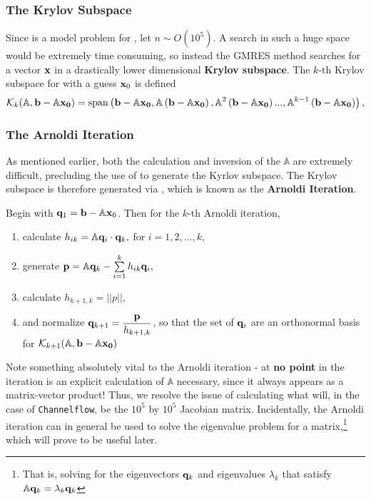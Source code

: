 \subsubsection{The Krylov Subspace}
Since  is a model problem for , let $n \sim O(10^5)$. A search in such a huge space would be extremely time consuming, so instead the GMRES method searches for a vector $\mathbf{x}$ in a drastically lower dimensional {\bf Krylov subspace}. The $k$-th Krylov subspace for  with a guess $\mathbf{x}_0$ is defined
\begin{equation}\label{eq:krylov}
\mathcal{K}_k(\mathbb{A},\mathbf{b}-\mathbb{A}\mathbf{x_0}) = \mathrm{span}\left ( \mathbf{b}-\mathbb{A}\mathbf{x_0},\mathbb{A}\left ( \mathbf{b}-\mathbb{A}\mathbf{x_0} \right ),\mathbb{A}^2\left ( \mathbf{b}-\mathbb{A}\mathbf{x_0} \right )...,\mathbb{A}^{k-1}\left ( \mathbf{b}-\mathbb{A}\mathbf{x_0} \right ) \right ),
 \end{equation}

 \subsubsection{The Arnoldi Iteration}
 
As mentioned earlier, both the calculation and inversion of the $\mathbb{A}$ are extremely difficult, precluding the use of  to generate the Kyrlov subspace. The Krylov subspace is therefore generated via , which is known as the {\bf Arnoldi Iteration}. 
\begin{algorithm}\label{alg:Arnoldi}
Begin with $\mathbf{q}_1 = \mathbf{b} - \mathbb{A}\mathbf{x}_0$. Then for the $k$-th Arnoldi iteration,
\begin{enumerate}
\item calculate $h_{ik} = \mathbb{A}\mathbf{q}_{i} \cdot \mathbf{q}_k,$ for $i = 1,2,...,k$,
\item generate $\Vector{p} = \mathbb{A}\Vector{q}_k - \sum{i=1}{k}{h_{ik}\Vector{q}_i},$ 
\item calculate $h_{k+1,k} = ||p||$,
\item and normalize $\mathbf{q}_{k+1} = \dfrac{\mathbf{p}}{h_{k+1,k}}$, so that the set of $\mathbf{q}_i$  are an orthonormal basis for $\mathcal{K}_{k+1}(\mathbb{A},\mathbf{b}-\mathbb{A}\mathbf{x_0})$ 
\end{enumerate}
\end{algorithm}
Note something absolutely vital to the Arnoldi iteration - at {\bf no point} in the iteration is an explicit calculation of $\mathbb{A}$ necessary, since it always appears as a matrix-vector product! Thus, we resolve the issue of calculating what will, in the case of {\tt Channelflow}, be the $10^5$ by $10^5$ Jacobian matrix.  Incidentally, the Arnoldi iteration can in general be used to solve the eigenvalue problem for a matrix,\footnote{That is, solving for the eigenvectors $\mathbf{q}_k$ and eigenvalues $\lambda_k$ that satisfy $\mathbb{A}\mathbf{q}_k = \lambda_k\mathbf{q}_k$} which will prove to be useful later.\\

